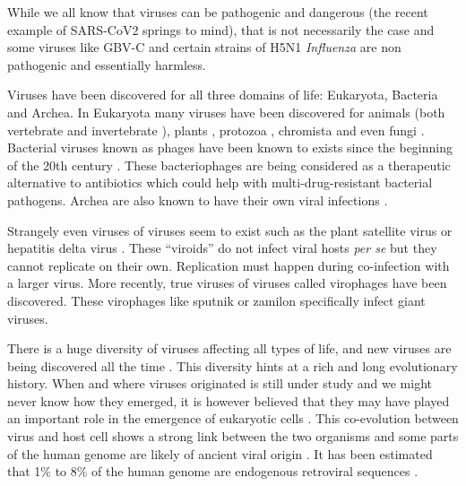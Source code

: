 \documentclass[
  11pt,
  twoside]{scrbook}
\begin{document}
While we all know that viruses can be pathogenic and dangerous (the recent example of SARS-CoV2 springs to mind), that is not necessarily the case and some viruses like GBV-C \autocite{stapletonGBVirusesReview2011} and certain strains of H5N1 \emph{Influenza} \autocite{yamamotoCharacterizationNonpathogenicH5N12011} are non pathogenic and essentially harmless.

Viruses have been discovered for all three domains of life: Eukaryota, Bacteria and Archea. In Eukaryota many viruses have been discovered for animals (both vertebrate \autocite{shiEvolutionaryHistoryVertebrate2018} and invertebrate \autocite{adamsAtlasInvertebrateViruses2017}), plants \autocite{lefeuvreEvolutionEcologyPlant2019}, protozoa \autocite{wangVirusesParasiticProtozoa1991}, chromista \autocite{ferminVirusesProkaryotesProtozoa2018} and even fungi \autocite{sutelaVirusesFungiOomycetes2019}. Bacterial viruses known as phages have been known to exists since the beginning of the 20th century \autocite{twortINVESTIGATIONNATUREULTRAMICROSCOPIC1915,delbrockBacterialVirusesBacteriophages1946}. These bacteriophages are being considered as a therapeutic alternative to antibiotics \autocite{clarkBacterialVirusesHuman2004,vankan-davelaarUsingVirusesNanomedicines2014} which could help with multi-drug-resistant bacterial pathogens. Archea are also known to have their own viral infections \autocite{prangishviliVirusesArchaea2016,prangishviliVirusesArchaeaUnifying2006}.

Strangely even viruses of viruses seem to exist such as the plant satellite virus \autocite{franckiPlantVirusSatellites,xuPlantVirusSatellites2011} or hepatitis delta virus \autocite{laiMolecularBiologyHepatitis1995,hughesHepatitisDeltaVirus2011}. These ``viroids'' do not infect viral hosts \emph{per se} but they cannot replicate on their own. Replication must happen during co-infection with a larger virus. More recently, true viruses of viruses called virophages have been discovered. These virophages like sputnik \autocite{desnuesChapterSputnikVirophage2012} or zamilon \autocite{gaiaZamilonNovelVirophage2014} specifically infect giant viruses.

There is a huge diversity of viruses affecting all types of life, and new viruses are being discovered all the time \autocite{edgarPetabasescaleSequenceAlignment2022}. This diversity hints at a rich and long evolutionary history. When and where viruses originated is still under study \autocite{nasirInvestigatingConceptOrigin2020,forterreOriginViruses2009} and we might never know how they emerged, it is however believed that they may have played an important role in the emergence of eukaryotic cells \autocite{forterreOriginVirusesTheir2006}. This co-evolution between virus and host cell shows a strong link between the two organisms and some parts of the human genome are likely of ancient viral origin \autocite{boekeRetrotransposonsEndogenousRetroviruses1997,kojimaViruslikeInsertionsSequence2021}. It has been estimated that 1\% to 8\% of the human genome are endogenous retroviral sequences \autocite{lowerVirusesAllUs1996,griffithsEndogenousRetrovirusesHuman2001}.
\end{document}
